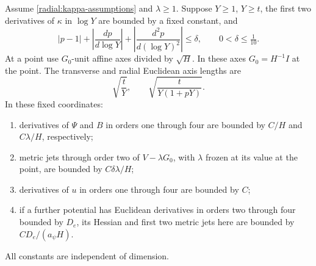 \begin{lemma}\label{radial:scaled}
Assume \eqref{radial:kappa-assumptions} and $\lambda\ge1$.
Suppose $Y\ge1$, $Y\ge t$, the first two derivatives of $\kappa$ in $\log Y$ are bounded by a fixed constant, and
\begin{equation}\label{radial:p-close}
 |p-1|+\left|\frac{dp}{d\log Y}\right|
      +\left|\frac{d^2p}{d(\log Y)^2}\right|\le\delta,
 \qquad 0<\delta\le\tfrac1{10}.
\end{equation}
At a point use $G_0$-unit affine axes divided by $\sqrt H$. In these axes $G_0=H^{-1}I$ at the point. The transverse and radial Euclidean axis lengths are
\begin{equation}\label{radial:axis-lengths}
 \sqrt{\frac tY},\qquad
 \sqrt{\frac{t}{Y(1+pY)}}.
\end{equation}
In these fixed coordinates:
\begin{enumerate}
\item derivatives of $\Psi$ and $B$ in orders one through four are bounded by $C/H$ and $C\lambda/H$, respectively;
\item metric jets through order two of $V-\lambda G_0$, with $\lambda$ frozen at its value at the point, are bounded by $C\delta\lambda/H$;
\item derivatives of $u$ in orders one through four are bounded by $C$;
\item if a further potential has Euclidean derivatives in orders two through four bounded by $D_e$, its Hessian and first two metric jets here are bounded by $CD_e/(a_\psi H)$.
\end{enumerate}
All constants are independent of dimension.
\end{lemma}

